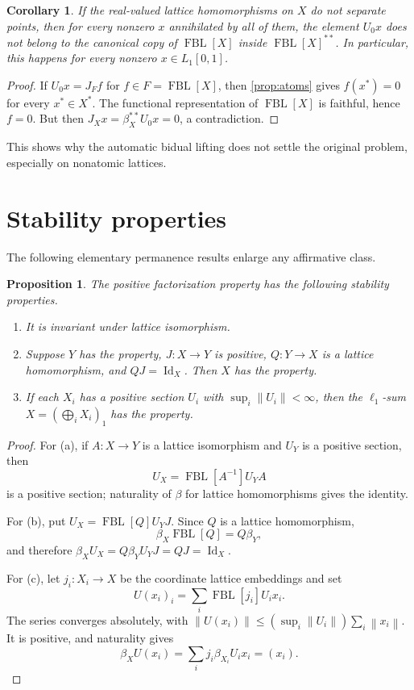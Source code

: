 \documentclass[11pt]{article}
\newtheorem{proposition}[theorem]{Proposition}
\newtheorem{corollary}[theorem]{Corollary}
\newcommand{\FBL}{\operatorname{FBL}}
\newcommand{\Id}{\operatorname{Id}}
\newcommand{\norm}[1]{\left\lVert #1\right\rVert}
\begin{document}
\begin{corollary}\label{cor:canonical-fails}
If the real-valued lattice homomorphisms on $X$ do not separate points, then
for every nonzero $x$ annihilated by all of them, the element $U_0x$ does not
belong to the canonical copy of $\FBL[X]$ inside $\FBL[X]^{**}$.  In
particular, this happens for every nonzero $x\in L_1[0,1]$.
\end{corollary}

\begin{proof}
If $U_0x=J_Ff$ for $f\in F=\FBL[X]$, then \cref{prop:atoms} gives
$f(x^*)=0$ for every $x^*\in X^*$.  The functional representation of
$\FBL[X]$ is faithful, hence $f=0$.  But then
$J_Xx=\beta_X^{**}U_0x=0$, a contradiction.
\end{proof}

This shows why the automatic bidual lifting does not settle the original
problem, especially on nonatomic lattices.

\section{Stability properties}

The following elementary permanence results enlarge any affirmative class.

\begin{proposition}\label{prop:stability}
The positive factorization property has the following stability properties.
\begin{enumerate}[label=(\alph*),leftmargin=2.2em]
\item It is invariant under lattice isomorphism.
\item Suppose $Y$ has the property, $J:X\to Y$ is positive,
$Q:Y\to X$ is a lattice homomorphism, and $QJ=\Id_X$.  Then $X$ has the
property.
\item If each $X_i$ has a positive section $U_i$ with
$\sup_i\norm{U_i}<\infty$, then the $\ell_1$-sum
$X=(\bigoplus_i X_i)_1$ has the property.
\end{enumerate}
\end{proposition}

\begin{proof}
For (a), if $A:X\to Y$ is a lattice isomorphism and $U_Y$ is a positive
section, then
\[
 U_X=\FBL[A^{-1}]U_YA
\]
is a positive section; naturality of $\beta$ for lattice homomorphisms gives
the identity.

For (b), put $U_X=\FBL[Q]U_YJ$.  Since $Q$ is a lattice homomorphism,
\[
 \beta_X\FBL[Q]=Q\beta_Y,
\]
and therefore $\beta_XU_X=Q\beta_YU_YJ=QJ=\Id_X$.

For (c), let $j_i:X_i\to X$ be the coordinate lattice embeddings and set
\[
 U(x_i)_i=\sum_i \FBL[j_i]U_ix_i.
\]
The series converges absolutely, with
$\norm{U(x_i)}\leq (\sup_i\norm{U_i})\sum_i\norm{x_i}$.  It is positive, and
naturality gives
\[
 \beta_XU(x_i)=\sum_i j_i\beta_{X_i}U_ix_i=(x_i).
\]
\end{proof}
\end{document}
